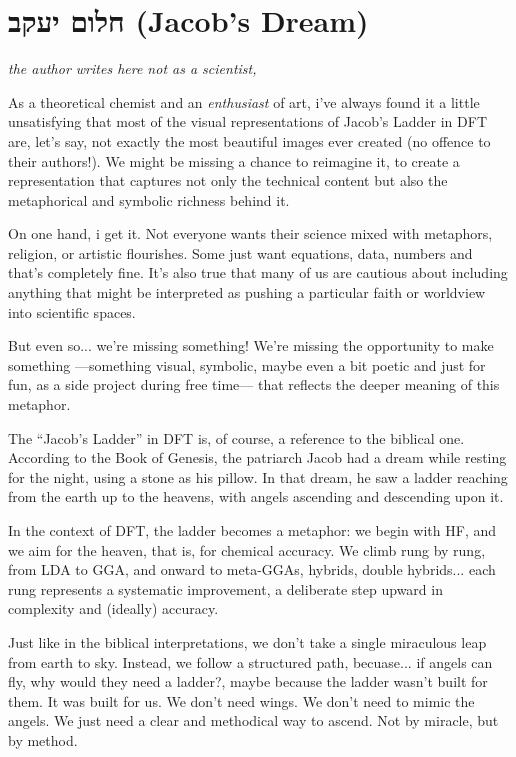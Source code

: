 \newpage
\section{{חלום יעקב} (Jacob's Dream)}

\begin{flushright}
\textit{the author writes here not as a scientist,}
\end{flushright}

As a theoretical chemist and an \emph{enthusiast} of art, i've always found it
a little unsatisfying that most of the visual representations of Jacob's Ladder
in \gls{DFT} are, let's say, not exactly the most beautiful images ever created
(no offence to their authors!). We might be missing a chance to reimagine it,
to create a representation that captures not only the technical content but also
the metaphorical and symbolic richness behind it.

On one hand, i get it. Not everyone wants their science mixed with metaphors,
religion, or artistic flourishes. Some just want equations, data, numbers
and that's completely fine. It's also true that many of us are cautious
about including anything that might be interpreted as pushing a particular faith
or worldview into scientific spaces.

But even so... we're missing something! We're missing the opportunity to make
something ---something visual, symbolic, maybe even a bit poetic and just for
fun, as a side project during free time--- that reflects the deeper meaning of
this metaphor.

The ``Jacob’s Ladder'' in \gls{DFT} is, of course, a reference to the biblical one.
According to the Book of Genesis, the patriarch Jacob had a dream while resting
for the night, using a stone as his pillow. In that dream, he saw a ladder
reaching from the earth up to the heavens, with angels ascending and descending
upon it.

In the context of \gls{DFT}, the ladder becomes a metaphor: we begin with
\gls{HF}, and we aim for the heaven, that is, for chemical accuracy. We climb
rung by rung, from \gls{LDA} to \gls{GGA}, and onward to meta-GGAs, hybrids,
double hybrids... each rung represents a systematic improvement, a deliberate
step upward in complexity and (ideally) accuracy.

Just like in the biblical interpretations, we don't take a single miraculous
leap from earth to sky. Instead, we follow a structured path, becuase...  if
angels can fly, why would they need a ladder?, maybe because the ladder wasn't
built for them. It was built for us. We don't need wings. We don't need to
mimic the angels. We just need a clear and methodical way to ascend. Not by
miracle, but by method.

